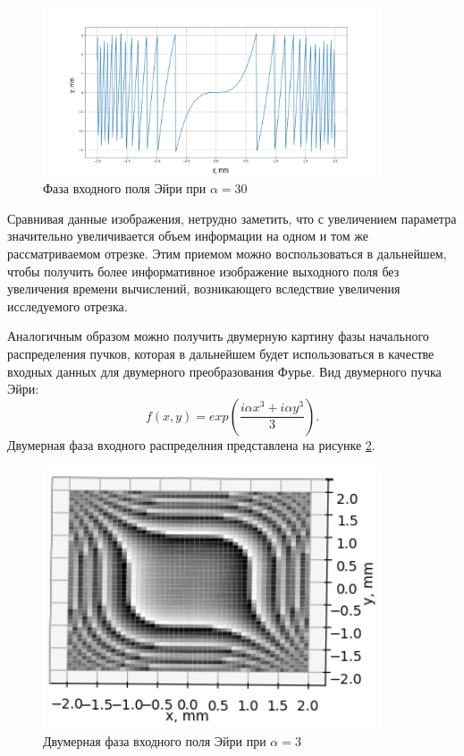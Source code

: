 {  \begin{figure}[H]
		  \begin{center}
			\includegraphics[width=10cm]{plots/airyphase1}
	\caption{  Фаза входного поля Эйри при $\alpha  = 30$}
	\label{airyphase1}
		 \end{center}
	
\end{figure}

	Сравнивая данные изображения, нетрудно заметить, что с увеличением
параметра значительно увеличивается объем информации на одном и том же
рассматриваемом отрезке. Этим приемом можно воспользоваться в
дальнейшем, чтобы получить более информативное изображение выходного поля без увеличения времени вычислений, возникающего вследствие
увеличения исследуемого отрезка.

Аналогичным образом можно получить двумерную картину фазы начального распределения пучков, которая в дальнейшем будет использоваться в качестве входных данных для двумерного преобразования Фурье. Вид двумерного пучка Эйри:
\begin{equation*} \label{zero_time_condition}
	f(x, y) = exp(\frac{i \alpha x^3 + i \alpha y^3}{3}).
		\end{equation*}
 Двумерная фаза входного распределния представлена на рисунке \ref{airy_phase_2d}.
		
 \begin{figure}[H]
		  \begin{center}
			\includegraphics[width=10cm]{plots/airy_phase_2d_ortho}
	\caption{Двумерная фаза входного поля Эйри при $\alpha  = 3$}
	\label{airy_phase_2d}
		 \end{center}
	

\end{figure}}
